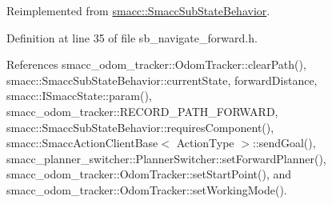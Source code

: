 Reimplemented from \hyperlink{classsmacc_1_1SmaccSubStateBehavior_a7c28e1c46238bbb2c2e0450573c6de94}{smacc\+::\+Smacc\+Sub\+State\+Behavior}.



Definition at line 35 of file sb\+\_\+navigate\+\_\+forward.\+h.



References smacc\+\_\+odom\+\_\+tracker\+::\+Odom\+Tracker\+::clear\+Path(), smacc\+::\+Smacc\+Sub\+State\+Behavior\+::current\+State, forward\+Distance, smacc\+::\+I\+Smacc\+State\+::param(), smacc\+\_\+odom\+\_\+tracker\+::\+R\+E\+C\+O\+R\+D\+\_\+\+P\+A\+T\+H\+\_\+\+F\+O\+R\+W\+A\+RD, smacc\+::\+Smacc\+Sub\+State\+Behavior\+::requires\+Component(), smacc\+::\+Smacc\+Action\+Client\+Base$<$ Action\+Type $>$\+::send\+Goal(), smacc\+\_\+planner\+\_\+switcher\+::\+Planner\+Switcher\+::set\+Forward\+Planner(), smacc\+\_\+odom\+\_\+tracker\+::\+Odom\+Tracker\+::set\+Start\+Point(), and smacc\+\_\+odom\+\_\+tracker\+::\+Odom\+Tracker\+::set\+Working\+Mode().


